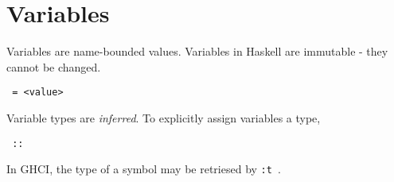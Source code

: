 \section{Variables}

Variables are name-bounded values. Variables in Haskell are immutable - they cannot be changed.

\begin{center}
  \texttt{ = <value>}
\end{center}

Variable types are \textit{inferred}. To explicitly assign variables a type,

\begin{center}
  \texttt{ :: }
\end{center}

In GHCI, the type of a symbol may be retriesed by \texttt{:t }.